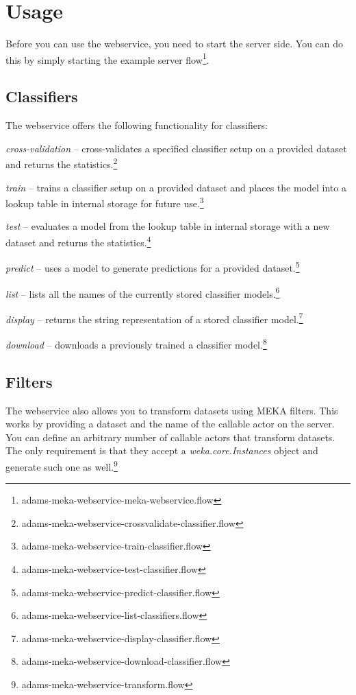 \documentclass[a4paper]{book}
\begin{document}
\clearpage
\chapter{Usage}
Before you can use the webservice, you need to start the server side. You can
do this by simply starting the example server 
flow\footnote{adams-meka-webservice-meka-webservice.flow}.

\section{Classifiers}
The webservice offers the following functionality for classifiers:
\begin{tight_itemize}
	\item \textit{cross-validation} -- cross-validates a specified classifier
	setup on a provided dataset and returns the statistics.\footnote{adams-meka-webservice-crossvalidate-classifier.flow}
	\item \textit{train} -- trains a classifier setup on a provided dataset 
	and places the model into a lookup table in internal storage for future
	use.\footnote{adams-meka-webservice-train-classifier.flow}
	\item \textit{test} -- evaluates a model from the lookup table in internal
	storage with a new dataset and returns the
	statistics.\footnote{adams-meka-webservice-test-classifier.flow}
	\item \textit{predict} -- uses a  model to generate predictions for
	a provided dataset.\footnote{adams-meka-webservice-predict-classifier.flow}
	\item \textit{list} -- lists all the names of the currently stored classifier
	models.\footnote{adams-meka-webservice-list-classifiers.flow}
	\item \textit{display} -- returns the string representation of a stored
	classifier model.\footnote{adams-meka-webservice-display-classifier.flow}
	\item \textit{download} -- downloads a previously trained a classifier 
	model.\footnote{adams-meka-webservice-download-classifier.flow}
\end{tight_itemize}

\section{Filters}
The webservice also allows you to transform datasets using MEKA filters. This
works by providing a dataset and the name of the callable actor on the server.
You can define an arbitrary number of callable actors that transform datasets.
The only requirement is that they accept a \textit{weka.core.Instances} object
and generate such one as well.\footnote{adams-meka-webservice-transform.flow}
\end{document}
